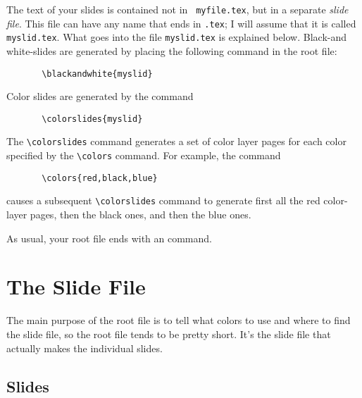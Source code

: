 The text of your slides is contained not in \xsp{}\mbox{\tt
myfile.tex}\Xsp, but in a separate {\it slide 
file}.	This file can have any name that ends in \mbox{\tt .tex}; I
will assume that it is called \xsp{}\mbox{\tt myslid.tex}\Xsp.	What
goes into the file \xsp{}\mbox{\tt myslid.tex}\xsp{} is explained
below.	Black-and white-slides are generated by placing the following
command in the root file:
\begin{verbatim}
       \blackandwhite{myslid}
\end{verbatim}
Color slides are generated by the command
\begin{verbatim}
       \colorslides{myslid}
\end{verbatim}
The \xsp{}\hbox{\verb"\colorslides"}\xsp{} command generates a set of
color layer pages for each color specified by the
\hbox{\verb"\colors"} command.	For example, the command
\begin{verbatim}
       \colors{red,black,blue}
\end{verbatim}
causes a subsequent \xsp{}\hbox{\verb"\colorslides"}\xsp{} command to
generate first all the red color-layer pages, then the black ones, and
then the blue ones.

As usual, your root file ends with an
\xsp{}\hbox{\verb""}\xsp{} command.

\section{The Slide File}

The main purpose of the root file is to tell \SLITEX{} what colors to
use and where to find the slide file, so the root file tends to be pretty
short.	It's the slide file that actually makes the individual
slides.


\subsection{Slides}

